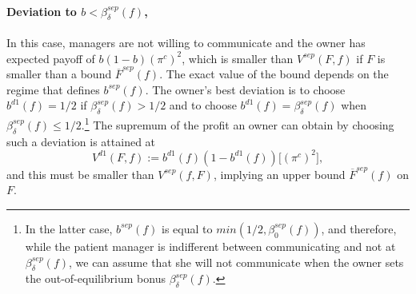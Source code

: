 \documentclass[]{article}
\begin{document}
\paragraph{Deviation to  $b<\beta^{sep}_\delta(f)$,}  In this case, managers are not willing to communicate and the owner has expected payoff of $b(1-b)(\pi^c)^2$, which is smaller than $V^{sep}(F,f)$ if $F$ is smaller than a bound $\overline F^{sep}(f)$. The exact value of the bound depends on the regime that defines $b^{sep}(f)$. The owner's best deviation is to choose $b^{d1}(f)=1/2$ if $\beta^{sep}_\delta(f)>1/2$ and to choose $b^{d1}(f)=\beta^{sep}_\delta(f)$ when $\beta^{sep}_\delta(f)\leq 1/2$.\footnote{In the latter case, $b^{sep}(f)$ is equal to $min(1/2,\beta^{sep}_0(f))$, and therefore, while the patient manager is indifferent between communicating and not at $\beta^{sep}_\delta(f)$, we can assume that she will not communicate when the owner sets the out-of-equilibrium bonus $\beta^{sep}_\delta(f)$.} The supremum of the profit an owner can obtain by choosing such a deviation is attained at 
%
\[
V^{d1}(F,f):=b^{d1}(f)(1-b^{d1}(f)) \big[(\pi^c)^2\big],
\]
and this must be smaller than $V^{sep}(f,F)$, implying an upper bound $\overline F^{sep}(f)$ on $F$.
\end{document}
